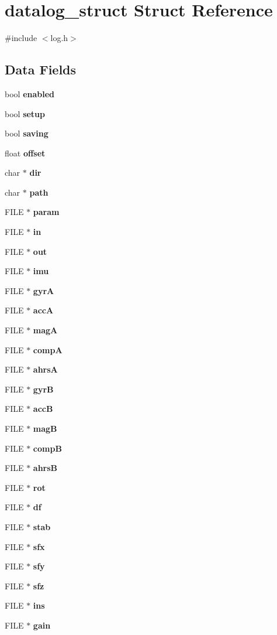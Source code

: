 \section{datalog\+\_\+struct Struct Reference}
\label{structdatalog__struct}


{\ttfamily \#include $<$log.\+h$>$}

\subsection*{Data Fields}
\begin{DoxyCompactItemize}
\item 
bool \textbf{ enabled}
\item 
bool \textbf{ setup}
\item 
bool \textbf{ saving}
\item 
float \textbf{ offset}
\item 
char $\ast$ \textbf{ dir}
\item 
char $\ast$ \textbf{ path}
\item 
F\+I\+LE $\ast$ \textbf{ param}
\item 
F\+I\+LE $\ast$ \textbf{ in}
\item 
F\+I\+LE $\ast$ \textbf{ out}
\item 
F\+I\+LE $\ast$ \textbf{ imu}
\item 
F\+I\+LE $\ast$ \textbf{ gyrA}
\item 
F\+I\+LE $\ast$ \textbf{ accA}
\item 
F\+I\+LE $\ast$ \textbf{ magA}
\item 
F\+I\+LE $\ast$ \textbf{ compA}
\item 
F\+I\+LE $\ast$ \textbf{ ahrsA}
\item 
F\+I\+LE $\ast$ \textbf{ gyrB}
\item 
F\+I\+LE $\ast$ \textbf{ accB}
\item 
F\+I\+LE $\ast$ \textbf{ magB}
\item 
F\+I\+LE $\ast$ \textbf{ compB}
\item 
F\+I\+LE $\ast$ \textbf{ ahrsB}
\item 
F\+I\+LE $\ast$ \textbf{ rot}
\item 
F\+I\+LE $\ast$ \textbf{ df}
\item 
F\+I\+LE $\ast$ \textbf{ stab}
\item 
F\+I\+LE $\ast$ \textbf{ sfx}
\item 
F\+I\+LE $\ast$ \textbf{ sfy}
\item 
F\+I\+LE $\ast$ \textbf{ sfz}
\item 
F\+I\+LE $\ast$ \textbf{ ins}
\item 
F\+I\+LE $\ast$ \textbf{ gain}
\end{DoxyCompactItemize}


